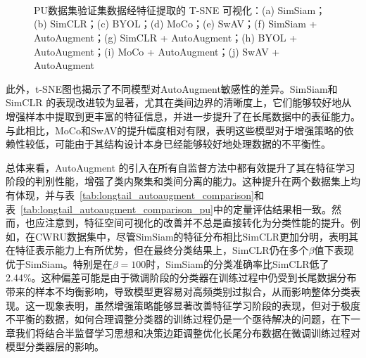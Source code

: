 \documentclass[master]{thesis-uestc}
\begin{document}
\begin{figure}[H]
    \centering
    \\
    \\
    \\
    \caption{PU数据集验证集数据经特征提取的 T-SNE 可视化：(a) SimSiam；(b) SimCLR；(c) BYOL；(d) MoCo；(e) SwAV；(f) SimSiam + AutoAugment；(g) SimCLR + AutoAugment；(h) BYOL + AutoAugment；(i) MoCo + AutoAugment；(j) SwAV + AutoAugment}
    \label{tsne_of_all_models_pu}
\end{figure}

此外，t-SNE图也揭示了不同模型对AutoAugment敏感性的差异。SimSiam和SimCLR 的表现改进较为显著，尤其在类间边界的清晰度上，它们能够较好地从增强样本中提取到更丰富的特征信息，并进一步提升了在长尾数据中的表征能力。与此相比，MoCo和SwAV的提升幅度相对有限，表明这些模型对于增强策略的依赖性较低，可能由于其结构设计本身已经能够较好地处理数据的不平衡性。

总体来看，AutoAugment 的引入在所有自监督方法中都有效提升了其在特征学习阶段的判别性能，增强了类内聚集和类间分离的能力。这种提升在两个数据集上均有体现，并与表~\ref{tab:longtail_autoaugment_comparison}和表~\ref{tab:longtail_autoaugment_comparison_pu}中的定量评估结果相一致。然而，也应注意到，特征空间可视化的改善并不总是直接转化为分类性能的提升。例如，在CWRU数据集中，尽管SimSiam的特征分布相比SimCLR更加分明，表明其在特征表示能力上有所优势，但在最终分类结果上，SimCLR仍在多个$\beta$值下表现优于SimSiam。特别是在$\beta=100$时，SimSiam的分类准确率比SimCLR低了2.44\%。这种偏差可能是由于微调阶段的分类器在训练过程中仍受到长尾数据分布带来的样本不均衡影响，导致模型更容易对高频类别过拟合，从而影响整体分类表现。这一现象表明，虽然增强策略能够显著改善特征学习阶段的表现，但对于极度不平衡的数据，如何合理调整分类器的训练过程仍是一个亟待解决的问题，在下一章我们将结合半监督学习思想和决策边距调整优化长尾分布数据在微调训练过程对模型分类器层的影响。
\end{document}
